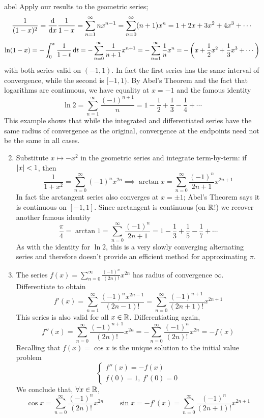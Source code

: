 \begin{examples}{}{abel}
\exstart{}\label{ex:abel1} Apply our results to the geometric series;
\[\frac 1{(1-x)^2}=\frac{\mathrm{d} }{\mathrm{d} x}\frac 1{1-x}=\sum_{n=1}^\infty nx^{n-1}=\sum_{n=0}^\infty (n+1)x^n=1+2x+3x^2+4x^3+\cdots\]
  \[\ln(1-x)=-\int_0^x\frac 1{1-t}\,{\mathrm{d} t}= -\sum_{n=0}^\infty\frac 1{n+1}x^{n+1}
  =-\sum_{n=1}^\infty \frac 1nx^n=-\left(x+\frac 12x^2+\frac 13x^3+\cdots\right)\]
  with both series valid on $(-1,1)$. In fact the first series has the same interval of convergence, while the second is $[-1,1)$. By Abel's Theorem and the fact that logarithms are continuous, we have equality at $x=-1$ and the famous identity
  \[\ln 2=\sum_{n=1}^\infty \frac{(-1)^{n+1}}{n}=1-\frac 12+\frac 13-\frac 14+\cdots\]
	This example shows that while the integrated and differentiated series have the same radius of convergence as the original, convergence at the endpoints need not be the same in all cases.
	
\begin{enumerate}\setcounter{enumi}{1}  
	\item Substitute $x\mapsto -x^2$ in the geometric series and integrate term-by-term: if $\left| x\right|<1$, then
	\[\frac 1{1+x^2}=\sum_{n=0}^\infty(-1)^nx^{2n} \implies  \arctan x=\sum_{n=0}^\infty\frac{(-1)^n}{2n+1}x^{2n+1}\]
	In fact the arctangent series also converges at $x=\pm 1$; Abel's Theorem says it is continuous on $[-1,1]$. Since arctangent is continuous (on $\mathbb{R}$!) we recover another famous identity
	\[\frac\pi 4=\arctan 1=\sum_{n=0}^\infty\frac{(-1)^n}{2n+1}=1-\frac 13+\frac 15-\frac 17+\cdots\]
	As with the identity for $\ln 2$, this is a very slowly converging alternating series and therefore doesn't provide an efficient method for approximating $\pi$.
  
  \item The series $\displaystyle f(x)=\sum_{n=0}^\infty \frac{(-1)^n}{(2n)!}x^{2n}$ has radius of convergence $\infty$. Differentiate to obtain
	\[f'(x)=\sum_{n=1}^\infty \frac{(-1)^nx^{2n-1}}{(2n-1)!}=\sum_{n=0}^\infty \frac{(-1)^{n+1}}{(2n+1)!}x^{2n+1}\]
	This series is also valid for all $x\in\mathbb{R}$. Differentiating again,
	\[f''(x)=\sum_{n=0}^\infty \frac{(-1)^{n+1}}{(2n)!}x^{2n}=-\sum_{n=0}^\infty \frac{(-1)^n}{(2n)!}x^{2n}=-f(x)\]
	Recalling that $f(x)=\cos x$ is the unique solution to the initial value problem
	\[\begin{cases}
	f''(x)=-f(x)\\
	f(0)=1,\ f'(0)=0
	\end{cases}\]
	We conclude that, $\forall x\in\mathbb{R}$,
	\[\cos x=\sum_{n=0}^\infty \frac{(-1)^n}{(2n)!}x^{2n} \qquad \sin x=-f'(x)=\sum_{n=0}^\infty \frac{(-1)^n}{(2n+1)!}x^{2n+1}\]
\end{enumerate}
\end{examples}


